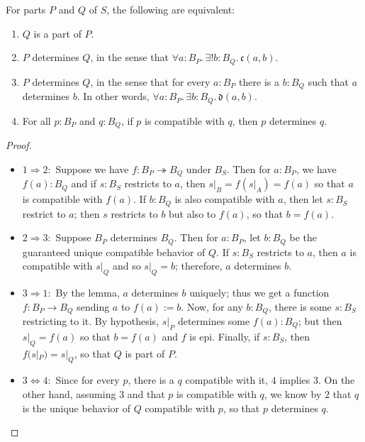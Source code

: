 \begin{claim}\label{Things:lem:Determines.Mereology}
For parts $P$ and $Q$ of $S$, the following are equivalent:
\begin{enumerate}
    \item $Q$ is a part of $P$.
    \item $P$ determines $Q$, in the sense that $\forall a : B_P.\, \exists! b : B_Q.\, \mathfrak{c}(a, b)$.
    \item $P$ determines $Q$, in the sense that for every $a : B_P$ there is a $b : B_Q$ such that $a$ determines $b$. In other words, $\forall a : B_P.\, \exists b : B_Q.\, \mathfrak{d}(a, b)$.
    \item For all $p : B_P$ and $q : B_Q$, if $p$ is compatible with $q$, then $p$ determines $q$.
\end{enumerate}
\end{claim}
\begin{proof}
\begin{itemize}
    \item $1 \Rightarrow 2:$ Suppose we have $f : B_P \twoheadrightarrow B_Q$ under $B_S$. Then for $a : B_P$, we have $f(a) : B_Q$ and if $s : B_S$ restricts to $a$, then $s|_B = f(s|_A) = f(a)$ so that $a$ is compatible with $f(a)$. If $b : B_Q$ is also compatible with $a$, then let $s : B_S$ restrict to $a$; then $s$ restricts to $b$ but also to $f(a)$, so that $b = f(a)$.
    \item $2 \Rightarrow 3:$ Suppose $B_P$ determines $B_Q$. Then for $a : B_P$, let $b : B_Q$ be the guaranteed unique compatible behavior of $Q$. If $s : B_S$ restricts to $a$, then $a$ is compatible with $s|_Q$ and so $s|_Q = b$; therefore, $a$ determines $b$.
    \item $3 \Rightarrow 1:$ By the lemma, $a$ determines $b$ uniquely; thus we get a function $f : B_P \to B_Q$ sending $a$ to $f(a) := b$. Now, for any $b : B_Q$, there is some $s : B_S$ restricting to it. By hypothesis, $s|_P$ determines some $f(a) : B_Q$; but then $s|_Q = f(a)$ so that $b = f(a)$ and $f$ is epi. Finally, if $s : B_S$, then $f(s|_P) = s|_Q$, so that $Q$ is part of $P$.
    \item $3 \iff 4:$ Since for every $p$, there is a $q$ compatible with it, $4$ implies $3$. On the other hand, assuming $3$ and that $p$ is compatible with $q$, we know by $2$ that $q$ is the unique behavior of $Q$ compatible with $p$, so that $p$ determines $q$.
\end{itemize}
\end{proof}

